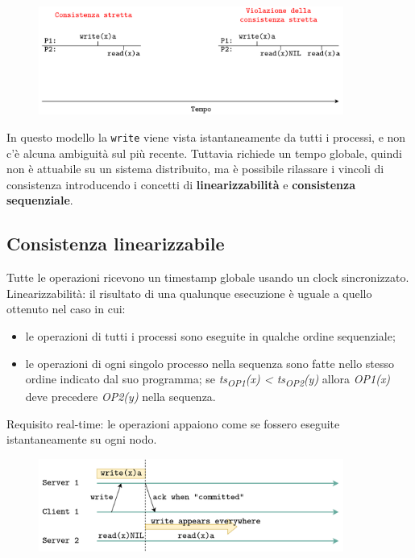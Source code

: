 \begin{figure}[ht]
    \centering
    \includegraphics[width=10cm]{./Images/cap2/2.22.png}
\end{figure}

In questo modello la \texttt{write} viene vista istantaneamente da tutti i processi, e non c'è alcuna ambiguità sul più recente. Tuttavia richiede un tempo globale, quindi non è attuabile su un sistema distribuito, ma è possibile rilassare i vincoli di consistenza introducendo i concetti di \textbf{linearizzabilità} e \textbf{consistenza sequenziale}.

\subsection{Consistenza linearizzabile}
Tutte le operazioni ricevono un timestamp globale usando un clock sincronizzato. Linearizzabilità: il risultato di una qualunque esecuzione è uguale a quello ottenuto nel caso in cui:
\begin{itemize}
    \item le operazioni di tutti i processi sono eseguite in qualche ordine sequenziale;
    \item le operazioni di ogni singolo processo nella sequenza sono fatte nello stesso ordine indicato dal suo programma;
    se \textit{ts\textsubscript{OP1}(x) < ts\textsubscript{OP2}(y)} allora \textit{OP1(x)} deve precedere \textit{OP2(y)} nella sequenza.
\end{itemize}
Requisito real-time: le operazioni appaiono come se fossero eseguite istantaneamente su ogni nodo.

\begin{figure}[ht]
    \centering
    \includegraphics[width=10cm]{./Images/cap2/2.23.png}
\end{figure}

